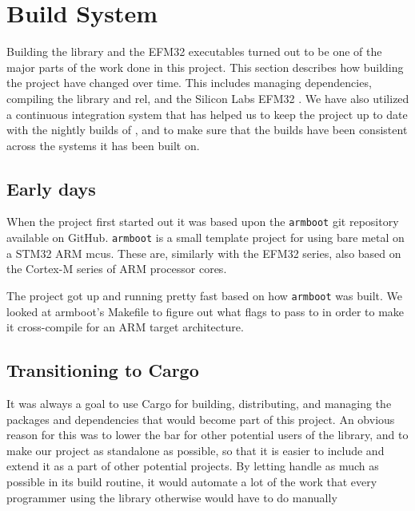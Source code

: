 \section{Build System}
\label{sec:build_system}

Building the library and the EFM32 executables turned out to be one of the major parts of the work done in this project.
This section describes how building the project have changed over time.
This includes managing dependencies, compiling the {\core} library and \gls{rel}, and the Silicon Labs EFM32 {\emlib}.
We have also utilized a continuous integration system that has helped us to keep the project up to date with the nightly builds of {\rust}, and to make sure that the builds have been consistent across the systems it has been built on.

\subsection{Early days}
\label{ssub:using_make}

When the project first started out it was based upon the \texttt{armboot} \cite{github:armboot} git repository available on GitHub.
\texttt{armboot} is a small template project for using {\rust} bare metal on a STM32 ARM \glspl{mcu}.
These are, similarly with the EFM32 series, also based on the Cortex-M series of ARM processor cores.

The project got up and running pretty fast based on how \texttt{armboot} was built.
We looked at armboot's Makefile to figure out what flags to pass to {\rustc} in order to make it cross-compile for an ARM target architecture.

\subsection{Transitioning to Cargo}
\label{ssub:transitioning_to_cargo}

It was always a goal to use Cargo for building, distributing, and managing the packages and dependencies that would become part of this project.
An obvious reason for this was to lower the bar for other potential users of the library, and to make our project as standalone as possible, so that it is easier to include and extend it as a part of other potential projects.
By letting {\cargo} handle as much as possible in its build routine, it would automate a lot of the work that every programmer using the library otherwise would have to do manually

